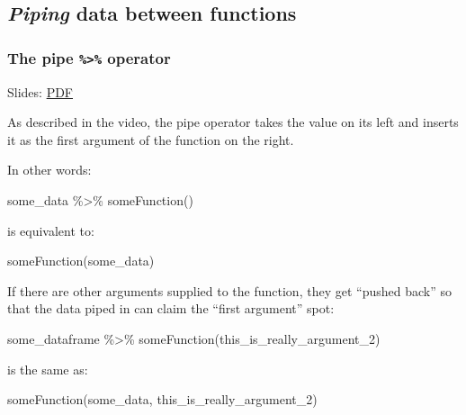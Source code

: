 \documentclass[
]{article}
\newenvironment{Shaded}{\begin{snugshade}}{\end{snugshade}}
\newcommand{\FunctionTok}[1]{\textcolor[rgb]{0.00,0.00,0.00}{#1}}
\newcommand{\NormalTok}[1]{#1}
\newcommand{\SpecialCharTok}[1]{\textcolor[rgb]{0.00,0.00,0.00}{#1}}
\theoremstyle{definition}
\theoremstyle{definition}
\theoremstyle{definition}
\theoremstyle{definition}
\theoremstyle{remark}
\begin{document}
\hypertarget{piping-data-between-functions}{%
\subsection{\texorpdfstring{\emph{Piping} data between functions}{Piping data between functions}}\label{piping-data-between-functions}}

\hypertarget{the-pipe-operator}{%
\subsubsection{\texorpdfstring{The pipe \texttt{\%\textgreater{}\%} operator}{The pipe \%\textgreater\% operator}}\label{the-pipe-operator}}

Slides: \href{https://drive.google.com/file/d/1SCd5J-w1Z9E6vmT2LbmaeDZaE8pDA2p4}{PDF}

As described in the video, the pipe operator takes the value on its left and inserts it as the first argument of the function on the right.

In other words:

\begin{Shaded}
\begin{Highlighting}[]
\NormalTok{some\_data }\SpecialCharTok{\%\textgreater{}\%} \FunctionTok{someFunction}\NormalTok{()}
\end{Highlighting}
\end{Shaded}

is equivalent to:

\begin{Shaded}
\begin{Highlighting}[]
\FunctionTok{someFunction}\NormalTok{(some\_data)}
\end{Highlighting}
\end{Shaded}

If there are other arguments supplied to the function, they get ``pushed back'' so that the data piped in can claim the ``first argument'' spot:

\begin{Shaded}
\begin{Highlighting}[]
\NormalTok{some\_dataframe }\SpecialCharTok{\%\textgreater{}\%} \FunctionTok{someFunction}\NormalTok{(this\_is\_really\_argument\_2)}
\end{Highlighting}
\end{Shaded}

is the same as:

\begin{Shaded}
\begin{Highlighting}[]
\FunctionTok{someFunction}\NormalTok{(some\_data, this\_is\_really\_argument\_2)}
\end{Highlighting}
\end{Shaded}
\end{document}
